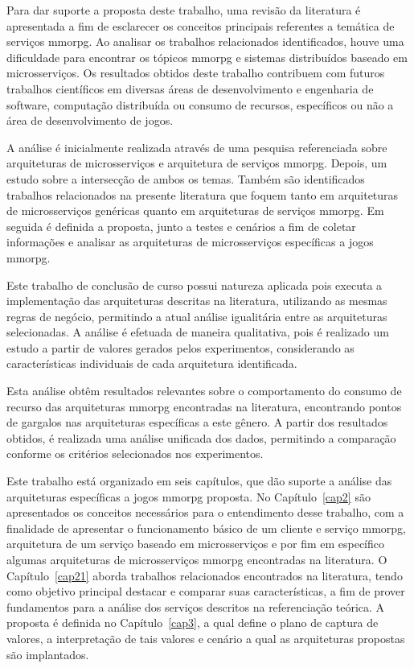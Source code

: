 Para dar suporte a proposta deste trabalho, uma revisão da literatura é apresentada a fim de esclarecer os conceitos principais referentes a temática de serviços \ac{mmorpg}.
%
Ao analisar os trabalhos relacionados identificados, houve uma dificuldade para encontrar os tópicos \ac{mmorpg} e sistemas distribuídos baseado em microsserviços.
%
Os resultados obtidos deste trabalho contribuem com futuros trabalhos científicos em diversas áreas de desenvolvimento e engenharia de software, computação distribuída ou consumo de recursos, específicos ou não a área de desenvolvimento de jogos.



A análise é inicialmente realizada através de uma pesquisa referenciada sobre arquiteturas de microsserviços e arquitetura de serviços \ac{mmorpg}.
%
Depois, um estudo sobre a intersecção de ambos os temas.
%
Também são identificados trabalhos relacionados na presente literatura que foquem tanto em arquiteturas de  microsserviços genéricas quanto em arquiteturas de serviços \ac{mmorpg}.
%
Em seguida é definida a proposta, junto a testes e cenários a fim de coletar informações e analisar as arquiteturas de microsserviços específicas a jogos \ac{mmorpg}.


Este trabalho de conclusão de curso possui natureza aplicada pois executa a implementação das arquiteturas descritas na literatura, utilizando as mesmas regras de negócio, permitindo a atual análise igualitária entre as arquiteturas selecionadas.
%
A análise é efetuada de maneira qualitativa, pois é realizado um estudo a partir de valores gerados pelos experimentos, considerando as características individuais de cada arquitetura identificada.

Esta análise obtêm resultados relevantes sobre o comportamento do consumo de recurso das arquiteturas \ac{mmorpg} encontradas na literatura, encontrando pontos de gargalos nas arquiteturas específicas a este gênero.
%
A partir dos resultados obtidos, é realizada uma análise unificada dos dados, permitindo a comparação conforme os critérios selecionados nos experimentos.

Este trabalho está organizado em seis capítulos, que dão suporte a análise das arquiteturas específicas a jogos \ac{mmorpg} proposta.
%
No Capítulo~\ref{cap2} são apresentados os conceitos necessários para o entendimento desse trabalho, com a finalidade de apresentar o funcionamento básico de um cliente e serviço \ac{mmorpg}, arquitetura de um serviço baseado em microsserviços e por fim em específico algumas arquiteturas de microsserviços \ac{mmorpg} encontradas na literatura.
%
O Capítulo~\ref{cap21} aborda trabalhos relacionados encontrados na literatura, tendo como objetivo principal destacar e comparar suas características, a fim de prover fundamentos para a análise dos serviços descritos na referenciação teórica.
%
A proposta é definida no Capítulo~\ref{cap3}, a qual define o plano de captura de valores, a interpretação de tais valores e cenário a qual as arquiteturas propostas são implantados.

